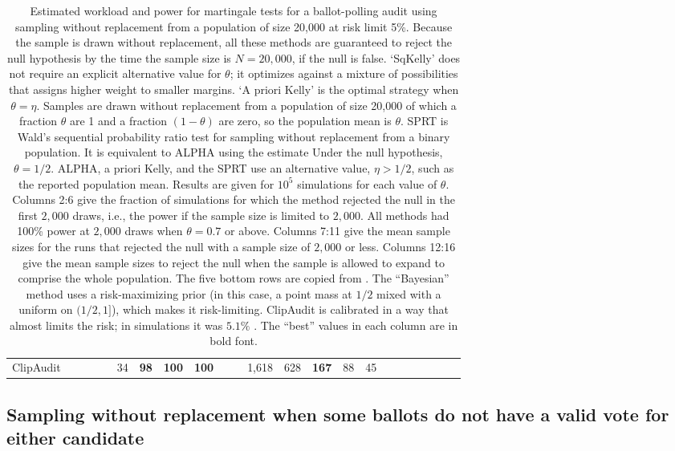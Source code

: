 \documentclass[12pt,runningheads]{llncs}
\begin{document}
{\begin{table}
\begin{tabular}{llr|rrrrrr|rrrrrrr|rrrrrrr}
ClipAudit &  & &&& 34 & \bf{98} & \bf{100} &\bf{100}&&& 1,618 & 628 & \bf{167} & 88 & 45 
\end{tabular} 
\caption{\protect \label{tab:finite-population}
Estimated workload and power for martingale tests for a ballot-polling audit using sampling without replacement from a population of 
size 20,000 at risk limit 5\%.
Because the sample is drawn without replacement, all these methods are guaranteed to reject the null hypothesis by the time
the sample size is $N=20,000$, if the null is false.
`SqKelly' does not require an explicit alternative value for $\theta$; it optimizes against a mixture of possibilities that assigns higher weight
to smaller margins.
`A priori Kelly' is the optimal strategy when $\theta = \eta$.
Samples are drawn without replacement from a population of size 20,000 of which a fraction $\theta$ are 1 and a fraction $(1-\theta)$
are zero, so the population mean is $\theta$.
SPRT is Wald's sequential probability ratio test for sampling without replacement from a binary population. 
It is equivalent to ALPHA using the estimate 
Under the null hypothesis, $\theta=1/2$. 
ALPHA, a priori Kelly, and the SPRT use an alternative value, $\eta > 1/2$, such as the reported population mean. 
Results are given for $10^5$ simulations for each value of $\theta$.
Columns 2:6 give the fraction of simulations for which the method rejected the null in the first $2,000$ draws, i.e., the power if the sample size is limited to $2,000$.
All methods had 100\% power at $2,000$ draws when $\theta=0.7$ or above.
Columns 7:11 give the mean sample sizes for the runs that rejected the null with a sample size of $2,000$ or less.
Columns 12:16 give the mean sample sizes to reject the null when the sample is allowed to
expand to comprise the whole population.
The five bottom rows are copied from \cite{huangEtal20}.
The ``Bayesian'' method uses a risk-maximizing prior \cite{vora19} (in this case, a point mass at $1/2$ mixed with a uniform on $(1/2, 1]$), which makes it risk-limiting.
ClipAudit \cite{rivest17} is calibrated in a way that almost limits the risk; in simulations it was $5.1\%$ \cite{huangEtal20}.
The ``best'' values in each column are in bold font.
}
\end{table}

\subsection{Sampling without replacement when some ballots do not have a valid vote for either candidate} \label{sec:blanks}

}
\end{document}
